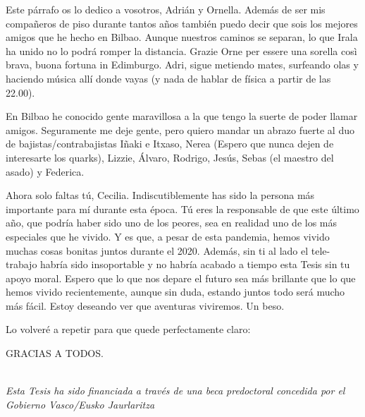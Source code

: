 Este párrafo os lo dedico a vosotros, Adrián y Ornella. Además de ser mis compañeros de piso durante tantos años también puedo decir que sois los mejores amigos que he hecho en Bilbao. Aunque nuestros caminos se separan, lo que Irala ha unido no lo podrá romper la distancia. Grazie Orne per essere una sorella così brava, buona fortuna in Edimburgo. Adri, sigue metiendo mates, surfeando olas y haciendo música allí donde vayas (y nada de hablar de física a partir de las 22.00).

En Bilbao he conocido gente maravillosa a la que tengo la suerte de poder llamar amigos. Seguramente me deje gente, pero quiero mandar un abrazo fuerte al duo de bajistas/contrabajistas Iñaki e Itxaso, Nerea (Espero que nunca dejen de interesarte los quarks), Lizzie, Álvaro, Rodrigo, Jesús, Sebas (el maestro del asado) y Federica.

Ahora solo faltas tú, Cecilia. Indiscutiblemente has sido la persona más importante para mí durante esta época. Tú eres la responsable de que este último año, que podría haber sido uno de los peores, sea en realidad uno de los más especiales que he vivido.  Y es que, a pesar de esta pandemia, hemos vivido muchas cosas bonitas juntos durante el 2020. Además, sin ti al lado el tele-trabajo habría sido insoportable y no habría acabado a tiempo esta Tesis sin tu apoyo moral. Espero que lo que nos depare el futuro sea más brillante que lo que hemos vivido recientemente, aunque sin duda, estando juntos todo será mucho más fácil. Estoy deseando ver que aventuras viviremos. Un beso.

Lo volveré a repetir para que quede perfectamente claro:
\begin{center}
  GRACIAS A TODOS.
\end{center}

~\\
{\it Esta Tesis ha sido financiada a trav\'es de una beca predoctoral concedida por el Gobierno Vasco/Eusko Jaurlaritza}
